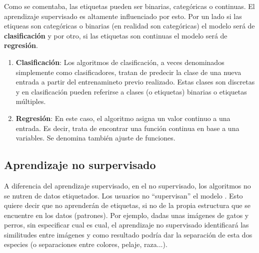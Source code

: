 
Como se comentaba, las etiquetas pueden ser binarias, categóricas o continuas.
El aprendizaje supervisado es altamente influenciado por esto. Por un lado si
las etiqueas son categóricas o binarias (en realidad son categóricas) el modelo
será de \textbf{clasificación} y por otro, si las etiquetas son continuas el
modelo será de \textbf{regresión}.

\begin{enumerate}
    \item \textbf{Clasificación}: Los algoritmos de clasificación, a veces
    denominados simplemente como clasificadores, tratan de predecir la clase de
    una nueva entrada a partir del entrenamineto previo realizado. Estas clases
    son discretas y en clasificación pueden referirse a clases (o etiquetas)
    binarias o etiquetas múltiples.
    
    \item \textbf{Regresión}: En este caso, el algoritmo asigna un valor
    continuo a una entrada. Es decir, trata de encontrar una función continua en
    base a una variables. Se denomina también ajuste de funciones.
\end{enumerate}

\clearpage

\subsection{Aprendizaje no surpervisado}

A diferencia del aprendizaje supervisado, en el no supervisado, los algoritmos
no se nutren de datos etiquetados. Los usuarios no ``supervisan'' el modelo
\cite{salim:usl}. Esto quiere decir que no aprenderán de etiquetas, si no de la
propia estructura que se encuentre en los datos (patrones). Por ejemplo, dadas
unas imágenes de gatos y perros, sin especificar cual es cual, el aprendizaje no
supervisado identificará las similitudes entre imágenes y como resultado podría
dar la separación de esta dos especies (o separaciones entre colores, pelaje,
raza...).

